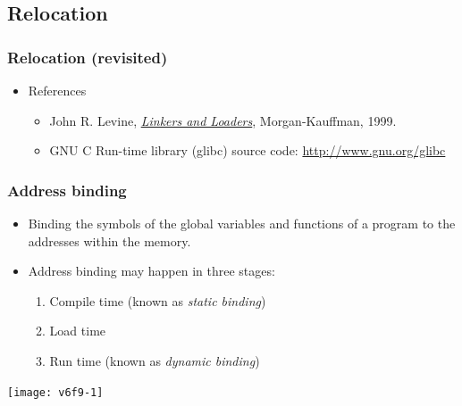 \documentclass[CJKutf8,dvipsnames,table]{beamer}
\begin{document}
\begin{CJK*}{UTF8}{song}
  \subsection{Relocation}

  \begin{frame}
    \frametitle{Relocation (revisited)} \pause
    \begin{itemize}
    \item References  \pause
      \begin{itemize}
      \item John R. Levine, \href{http://linker.iecc.com}{\emph{Linkers and Loaders}}, Morgan-Kauffman, 1999.  \pause
      \item GNU C Run-time library (glibc) source code: \url{http://www.gnu.org/glibc} 
      \end{itemize}
    \end{itemize}
  \end{frame}
  
  \begin{frame}
    \frametitle{Address binding} \pause
    \begin{minipage}[c]{0.6\textwidth}
      \begin{itemize}
      \item Binding the symbols of the global variables and functions of a program to the addresses within the memory.  \pause
      \item Address binding may happen in three stages:  \pause
        \begin{enumerate}
        \item Compile time (known as \emph{static binding})  \pause
        \item Load time  \pause
        \item Run time (known as \emph{dynamic binding})  \pause
        \end{enumerate}
      \end{itemize}
    \end{minipage}%
    \begin{minipage}[c]{0.4\textwidth}
      \texttt{[image: v6f9-1]}
    \end{minipage}
  \end{frame}

  \iffalse


\end{CJK*}
\end{document}
